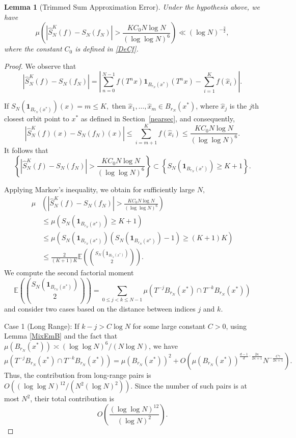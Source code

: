 \documentclass[11pt,twoside,a4paper,reqno]{amsart}
\newtheorem{lemma}[theorem]{Lemma}
\newcommand{\E}{\mathbb{E}}
\def\one{{\mathbf{1}}}
\begin{document}
\begin{lemma}[Trimmed Sum Approximation Error]\label{TSAR}
Under the hypothesis above, we have
\begin{equation}\label{SumkDf}
\mu\left(\left| \hat{S}_N^K(f) - S_N(f_N) \right|>\frac{KC_0N\log N}{(\log \log N)^6}\right) \ll (\log N)^{-\frac{3}{2}},
\end{equation}
where the constant $C_0$ is defined in \eqref{DeCf}.
\end{lemma}
\begin{proof}
We observe that
$$\left| \hat{S}_N^K(f) - S_N(f_N) \right| = \left| \sum_{n=0}^{N-1} f(T^n x) \one_{B_{r_N}(x^*)}(T^n x) - \sum_{i=1}^K f(\hat{x}_i) \right|.$$

If $S_N(\one_{B_{r_N}(x^*)})(x)=m\leq K,$ then $\hat{x}_1,\ldots,\hat{x}_m \in B_{r_N}(x^*)$, where $\hat{x}_j$ is the $j$th closest orbit point to $x^*$ as defined in Section~\ref{nearsec}, and consequently,
\begin{equation*}
\left| \hat{S}_N^K(f)(x) - S_N(f_N)(x) \right| \leq \sum_{i=m+1}^K f(\hat{x}_i) \leq \frac{KC_0N\log N}{(\log \log N)^6}.
\end{equation*}
It follows that
$$\left\{\left|\hat{S}_N^K(f) - S_N(f_N)\right|>\frac{KC_0N\log N}{(\log \log N)^6}\right\}\subset \left\{S_N(\one_{B_{r_N}(x^*)}) \geq K+1\right\}.$$





Applying Markov's inequality, we obtain for sufficiently large $N,$
\begin{equation}\label{TriDf}
\begin{aligned}
\mu&\left( \left| \hat{S}_N^K(f) - S_N(f_N) \right| >\frac{KC_0N\log N}{(\log \log N)^6}\right)\\
&\leq\mu\left( S_N(\one_{B_{r_N}(x^*)}) \geq K+1 \right) \\
&\leq \mu\left(S_N(\one_{B_{r_N}(x^*)})\left(S_N(\one_{B_{r_N}(x^*)})-1\right)\geq (K+1)K\right)\\
&\leq \frac{2}{(K+1)K}\E\left(\binom{S_N(\one_{B_{r_N}(x^*)})}{2}\right).
\end{aligned}
\end{equation}
We compute the  second factorial moment
$$
\mathbb{E}\left( \binom{S_N(\mathbf{1}_{B_{r_N}(x^*)})}{2} \right) = \sum_{0 \leq j < k \leq N-1} \mu\left( T^{-j} B_{r_N}(x^*) \cap T^{-k} B_{r_N}(x^*) \right)
$$
and consider two cases based on the distance between indices $j$ and $k.$

Case 1 (Long Range): If $k-j > C \log N$ for some large constant $C>0$, using Lemma \ref{MixEmB} and the fact that $\mu(B_{r_N}(x^*)) \asymp (\log \log N)^6 / (N \log N)$, we have
$$
\mu\left( T^{-j} B_{r_N}(x^*) \cap T^{-k} B_{r_N}(x^*) \right) = \mu(B_{r_N}(x^*))^2 + O\left( \mu(B_{r_N}(x^*))^{\frac{d-1}{d} \cdot \frac{2\kappa}{2\kappa+1}} N^{-\frac{C \gamma}{2\kappa+1}} \right).
$$
Thus, the contribution from long-range pairs is $O\left( (\log \log N)^{12} / (N^2(\log N)^2) \right).$
Since the number of such pairs is at most $N^2$, their total contribution is
$$O\left( \frac{(\log \log N)^{12}}{(\log N)^2} \right).$$


\end{proof}
\end{document}

